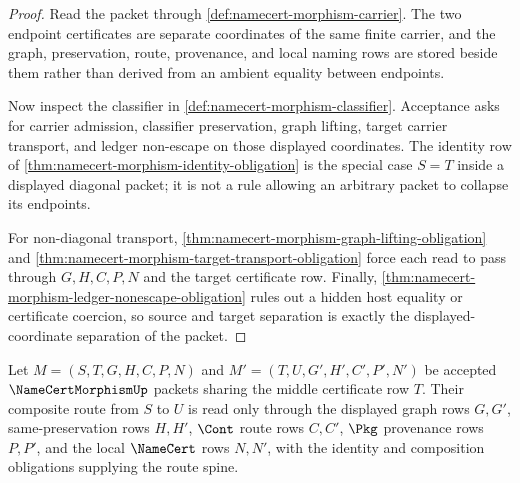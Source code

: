 \begin{proof}
Read the packet through \autoref{def:namecert-morphism-carrier}. The two endpoint certificates are separate coordinates of the same finite carrier, and the graph, preservation, route, provenance, and local naming rows are stored beside them rather than derived from an ambient equality between endpoints.

Now inspect the classifier in \autoref{def:namecert-morphism-classifier}. Acceptance asks for carrier admission, classifier preservation, graph lifting, target carrier transport, and ledger non-escape on those displayed coordinates. The identity row of \autoref{thm:namecert-morphism-identity-obligation} is the special case $S=T$ inside a displayed diagonal packet; it is not a rule allowing an arbitrary packet to collapse its endpoints.

For non-diagonal transport, \autoref{thm:namecert-morphism-graph-lifting-obligation} and \autoref{thm:namecert-morphism-target-transport-obligation} force each read to pass through $G,H,C,P,N$ and the target certificate row. Finally, \autoref{thm:namecert-morphism-ledger-nonescape-obligation} rules out a hidden host equality or certificate coercion, so source and target separation is exactly the displayed-coordinate separation of the packet.
\end{proof}

\begin{theorem}
\label{thm:namecert-morphism-route-composition-scope}
Let $M=(S,T,G,H,C,P,N)$ and $M'=(T,U,G',H',C',P',N')$ be accepted $\NameCertMorphismUp$ packets sharing the middle certificate row $T$. Their composite route from $S$ to $U$ is read only through the displayed graph rows $G,G'$, same-preservation rows $H,H'$, $\Cont$ route rows $C,C'$, $\Pkg$ provenance rows $P,P'$, and the local $\NameCert$ rows $N,N'$, with the identity and composition obligations supplying the route spine.
\end{theorem}

